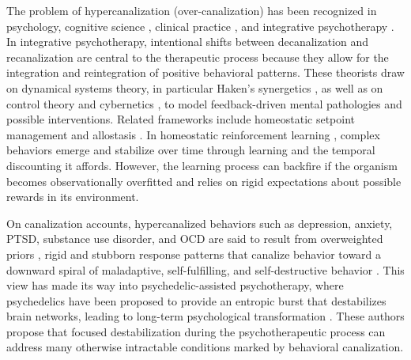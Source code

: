 \documentclass[12pt,fleqn]{article}
\begin{document}
The problem of hypercanalization (over-canalization) has been recognized in psychology, cognitive science \cite{lloyd_understanding_2023}, clinical practice \cite{addicott_primer_2017}, and integrative psychotherapy \cite{schiepek_self-organization_2014, schiepek_integrative_2015, schiepek_psychotherapy_2017}. In integrative psychotherapy, intentional shifts between decanalization and recanalization are central to the therapeutic process because they allow for the integration and reintegration of positive behavioral patterns. These theorists draw on dynamical systems theory, in particular Haken's synergetics \cite{haken_synergetics_1977}, as well as on control theory and cybernetics \cite{wiener_cybernetics_2019}, to model feedback-driven mental pathologies and possible interventions. Related frameworks include homeostatic setpoint management and allostasis \cite{sterling_allostasis_1988, sterling_allostasis_2012}. In homeostatic reinforcement learning \cite{keramati_homeostatic_2014}, complex behaviors emerge and stabilize over time through learning and the temporal discounting it affords. However, the learning process can backfire if the organism becomes observationally overfitted and relies on rigid expectations about possible rewards in its environment.

On canalization accounts, hypercanalized behaviors such as depression, anxiety, PTSD, substance use disorder, and OCD are said to result from overweighted priors \cite{carhart-harris_canalization_2023}, rigid and stubborn response patterns that canalize behavior toward a downward spiral of maladaptive, self-fulfilling, and self-destructive behavior \cite{scheffer_dynamical_2024}. This view has made its way into psychedelic-assisted psychotherapy, where psychedelics have been proposed to provide an entropic burst that destabilizes brain networks, leading to long-term psychological transformation \cite{carhart-harris_entropic_2014, hipolito_pattern_2023, girn_complex_2023}. These authors propose that focused destabilization during the psychotherapeutic process can address many otherwise intractable conditions marked by behavioral canalization.
\end{document}
